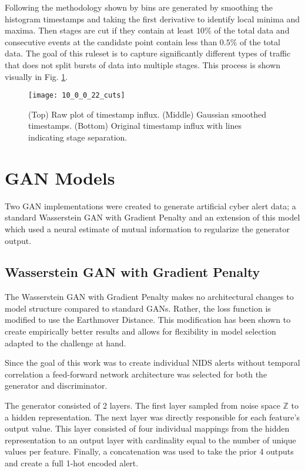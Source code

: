 Following the methodology shown by \cite{us} bins are generated by smoothing the histogram timestamps and taking the first derivative to identify local minima and maxima. Then stages are cut if they contain at least $10\%$ of the total data and consecutive events at the candidate point contain less than $0.5\%$ of the total data. The goal of this ruleset is to capture significantly different types of traffic that does not split bursts of data into multiple stages. This process is shown visually in Fig. \ref{fig:cut_process}.

\begin{figure}[!htbp]
	\centering%
	\texttt{[image: 10\_0\_0\_22\_cuts]}
	\caption{
		(Top) Raw plot of timestamp influx.
		(Middle) Gaussian smoothed timestamps.
		(Bottom) Original timestamp influx with lines indicating stage separation. 
	}
	\label{fig:cut_process}
\end{figure}

\section{GAN Models}
\label{sec:model_arch}
Two GAN implementations were created to generate artificial cyber alert data; a standard Wasserstein GAN with Gradient Penalty and an extension of this model which used a neural estimate of mutual information to regularize the generator output.  

\subsection{Wasserstein GAN with Gradient Penalty}
\label{sec:gan}
The Wasserstein GAN with Gradient Penalty makes no architectural changes to model structure compared to standard GANs. Rather, the loss function is modified to use the Earthmover Distance. This modification has been shown to create empirically better results and allows for flexibility in model selection adapted to the challenge at hand.

Since the goal of this work was to create individual NIDS alerts without temporal correlation a feed-forward network architecture was selected for both the generator and discriminator. 

The generator consisted of 2 layers. The first layer sampled from noise space $\mathbb{Z}$ to a hidden representation. The next layer was directly responsible for each feature's output value. This layer consisted of four individual mappings from the hidden representation to an output layer with cardinality equal to the number of unique values per feature. Finally, a concatenation was used to take the prior 4 outputs and create a full 1-hot encoded alert. 

